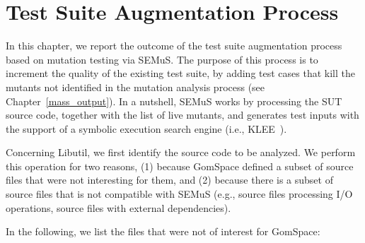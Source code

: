
\chapter{Test Suite Augmentation Process}

In this chapter, we report the outcome of the test suite augmentation process based on mutation testing via SEMuS. The purpose of this process is to increment the quality of the existing test suite, by adding test cases that kill the mutants not identified in the mutation analysis process (see Chapter~\ref{mass_output}). 
In a nutshell, SEMuS works by processing the SUT source code, together with the list of live mutants, and generates test inputs with the support of a symbolic execution search engine (i.e., KLEE~\cite{cadar2008klee}).


Concerning Libutil, we first identify the source code to be analyzed. We perform this operation for two reasons, (1) because GomSpace defined a subset of source files that were not interesting for them, and (2) because there is a subset of source files that is not compatible with SEMuS (e.g., source files processing I/O operations, source files with external dependencies).  

In the following, we list the files that were not of interest for GomSpace:

